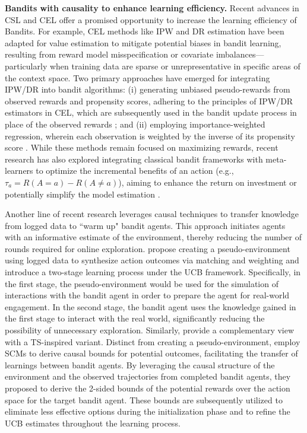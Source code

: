 \textbf{Bandits with causality to enhance learning efficiency. }
Recent advances in \acrshort{CSL} and \acrshort{CEL} offer a promised opportunity to increase the learning efficiency of Bandits. For example, \acrshort{CEL} methods like \acrshort{IPW} and \acrshort{DR} estimation have been adapted for value estimation to mitigate potential biases in bandit learning, resulting from reward model misspecification or covariate imbalances—particularly when training data are sparse or unrepresentative in specific areas of the context space. Two primary approaches have emerged for integrating \acrshort{IPW}/\acrshort{DR} into bandit algorithms: (i) generating unbiased pseudo-rewards from observed rewards and propensity scores, adhering to the principles of \acrshort{IPW}/\acrshort{DR} estimators in \acrshort{CEL}, which are subsequently used in the bandit update process in place of the observed rewards \citep{bietti2021contextual, kim2019doubly, kim2021doubly, kim2023double}; and (ii) employing importance-weighted regression, wherein each observation is weighted by the inverse of its propensity score \citep{dimakopoulou2019balanced, bietti2021contextual}. While these methods remain focused on maximizing rewards, recent research has also explored integrating classical bandit frameworks with meta-learners to optimize the incremental benefits of an action (e.g., $\tau_{a} = R(A = a) - R(A \neq a)$), aiming to enhance the return on investment \citep{sawant2018contextual, kanase2022application, zhao2022mitigating} or potentially simplify the model estimation \citep{carranza2023flexible}.

Another line of recent research leverages causal techniques to transfer knowledge from logged data to ``warm up" bandit agents. This approach initiates agents with an informative estimate of the environment, thereby reducing the number of rounds required for online exploration. \citet{li2021unifying} propose creating a pseudo-environment using logged data to synthesize action outcomes via matching and weighting and introduce a two-stage learning process under the \acrshort{UCB} framework. Specifically, in the first stage, the pseudo-environment would be used for the simulation of interactions with the bandit agent in order to prepare the agent for real-world engagement. In the second stage, the bandit agent uses the knowledge gained in the first stage to interact with the real world, significantly reducing the possibility of unnecessary exploration. Similarly, \citet{xu2023thompson} provide a complementary view with a \acrshort{TS}-inspired variant. Distinct from creating a pseudo-environment, \citet{zhang2017transfer} employ \acrshort{SCM}s to derive causal bounds for potential outcomes, facilitating the transfer of learnings between bandit agents. By leveraging the causal structure of the environment and the observed trajectories from completed bandit agents, they proposed to derive the 2-sided bounds of the potential rewards over the action space for the target bandit agent. These bounds are subsequently utilized to eliminate less effective options during the initialization phase and to refine the \acrshort{UCB} estimates throughout the learning process.

